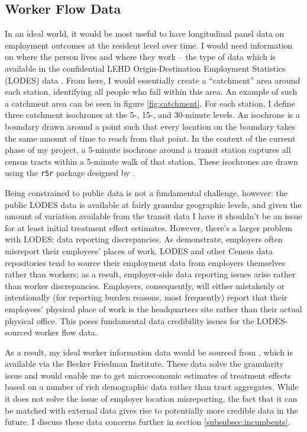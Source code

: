 \documentclass[12pt]{article}
\begin{document}
\subsection{Worker Flow Data}
In an ideal world, it would be most useful to have longitudinal panel data on employment outcomes at the resident level over time. I would need information on where the person lives and where they work  --  the type of data which is available in the confidential LEHD Origin-Destination Employment Statistics (LODES) data \parencite{census_lodes}. From here, I would essentially create a ``catchment'' area around each station, identifying all people who fall within this area. An example of such a catchment area can be seen in figure \ref{fig:catchment}. For each station, I define three catchment isochrones at the 5-, 15-, and 30-minute levels. An isochrone is a boundary drawn around a point such that every location on the boundary takes the same amount of time to reach from that point. In the context of the current phase of my project, a 5-minute isochrone around a transit station captures all census tracts within a 5-minute walk of that station. These isochrones are drawn using the \texttt{r5r} package designed by \textcite{r5r}. 

Being constrained to public data is not a fundamental challenge, however: the public LODES data is available at fairly granular geographic levels, and given the amount of variation available from the transit data I have it shouldn't be an issue for at least initial treatment effect estimates. However, there's a larger problem with LODES: data reporting discrepancies. As \textcite{abrahamExploringDifferencesEmployment2013} demonstrate, employers often misreport their employees' places of work. LODES and other Census data repositories tend to source their employment data from employers themselves rather than workers; as a result, employer-side data reporting issues arise rather than worker discrepancies. Employers, consequently, will either mistakenly or intentionally (for reporting burden reasons, most frequently) report that their employees' physical place of work is the headquarters site rather than their actual physical office. This poses fundamental data credibility issues for the LODES-sourced worker flow data. 

As a result, my ideal worker information data would be sourced from \textcite{infogroup_residential}, which is available via the Becker Friedman Institute. These data solve the granularity issue and would enable me to get microeconomic estimates of treatment effects based on a number of rich demographic data rather than tract aggregates. While it does not solve the issue of employer location misreporting, the fact that it can be matched with external data gives rise to potentially more credible data in the future. I discuss these data concerns further in section \ref{subsubsec:incumbents}.
\end{document}
